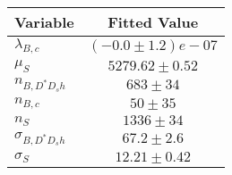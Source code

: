 \begin{tabular}[t]{lc}
\hline
Variable &Fitted Value\\
\hline\hline
$\lambda_{B,c}$&$(-0.0\pm1.2)e-07$\\
\hline
$\mu_S$&$5279.62\pm0.52$\\
\hline
$n_{B, D^* D_s h}$&$683\pm34$\\
\hline
$n_{B,c}$&$50\pm35$\\
\hline
$n_S$&$1336\pm34$\\
\hline
$\sigma_{B, D^* D_s h}$&$67.2\pm2.6$\\
\hline
$\sigma_S$&$12.21\pm0.42$\\
\hline
\end{tabular}
